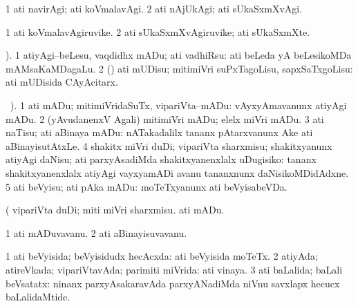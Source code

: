 \bentry
{}
\gl{\kirxvi}
\bmng
\bnum
\num{1} ati navirAgi; ati koVmalavAgi. 
\num{2} ati nAjUkAgi; ati sUkaSxmXvAgi. 
\enum
\emng
\eentry

\bentry
{}
\gl{\nA}
\bmng
\bnum
\num{1} ati koVmalavAgiruvike.
\num{2} ati sUkaSxmXvAgiruvike; ati sUkaSxmXte. 
\enum
\emng
\eentry

\bentry
{}
\gl{\sakirx}
). \bmng
\bnum
\num{1} atiyAgi--beLesu, vaqdidhx mADu; ati vadhiRsu:  ati beLeda yA beLesikoMDa mAMsaKaMDagaLu. 
\num{2} (\CA) ati mUDisu; mitimiVri suPxTagoLisu, sapxSaTxgoLisu:  ati mUDisida CAyAcitarx. 
\enum
\emng
\eentry

\bentry
{}
\gl{\sakirx}
 \BUkaq\ ). \bmng
\bnum
\num{1} ati mADu; mitimiVridaSuTx, vipariVta--mADu:  vAyxyAmavanunx atiyAgi mADu. 
\num{2} (yAvudanenxV Agali) mitimiVri mADu; elelx miVri mADu. 
\num{3} ati naTisu; ati aBinaya mADu:  nATakadalilx tananx pAtarxvanunx Ake ati aBinayisutAtxLe. 
\num{4} shakitx miVri duDi; vipariVta sharxmisu; shakitxyanunx atiyAgi daNisu; ati parxyAsadiMda shakitxyanenxlalx uDugisiko:  tananx shakitxyanenxlalx atiyAgi vayxyamADi avanu tananxnunx daNisikoMDidAdxne. 
\num{5} ati beVyisu; ati pAka mADu:  moTeTxyanunx ati beVyisabeVDa. 
\enum
\emng

\noindent
\gl{\pagu}
\bmng
{} (  
\banum
{} vipariVta duDi; miti miVri sharxmisu. 
 ati mADu. 
\eanum
\emng
\eentry

\bentry
{}
\gl{\nA}
\bmng
\bnum
\num{1} ati mADuvavanu. 
\num{2} ati aBinayisuvavanu. 
\enum
\emng
\eentry

\bentry
{}
\gl{\gu}
\bmng
\bnum
\num{1} ati beVyisida; beVyisidudx hecAcxda:  ati beVyisida moTeTx. 
\num{2} atiyAda; atireVkada; vipariVtavAda; parimiti miVrida:  ati vinaya. 
\num{3} ati baLalida; baLali beVsatatx:  ninanx parxyAsakaravAda parxyANadiMda niVnu savxlapx hecucx baLalidaMtide. 
\enum
\emng
\eentry

